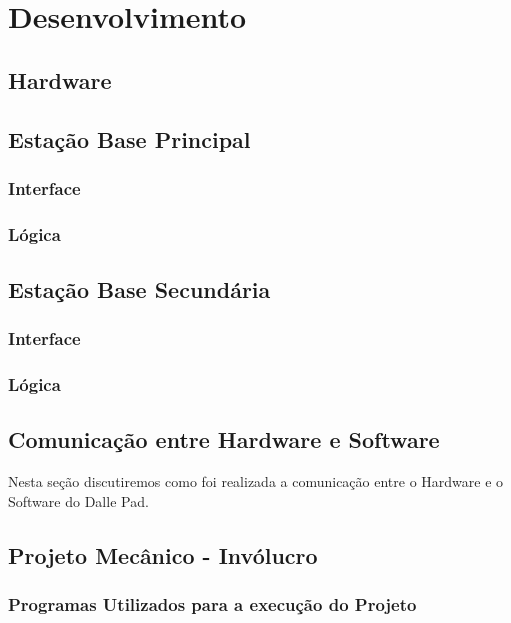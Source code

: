
\chapter{Desenvolvimento}
\label{chap:desenvolvimento}



    \section{Hardware}


    \section{Estação Base Principal}



        \subsection{Interface}



        \subsection{Lógica}


    \section{Estação Base Secundária}



        \subsection{Interface}



        \subsection{Lógica}



    \section{Comunicação entre Hardware e Software}

        Nesta seção discutiremos como foi realizada a comunicação entre o Hardware e o Software do Dalle Pad.

    \section{Projeto Mecânico - Invólucro}



        \subsection{Programas Utilizados para a execução do Projeto}

